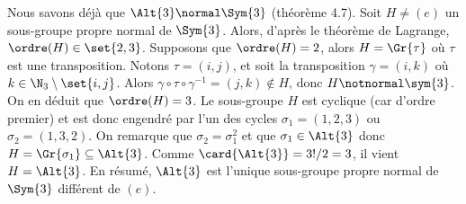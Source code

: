 Nous savons déjà que $\Alt{3}\normal\Sym{3}$ (théorème 4.7).  Soit $H\neq (e)$
un sous-groupe propre normal de $\Sym{3}$. Alors, d'après le théorème de
Lagrange, $\ordre(H)\in\set{2,3}$.  Supposons que $\ordre(H) = 2$, alors
$H = \Gr{\tau}$ où $\tau$ est une transposition.  Notons $\tau = (i,j)$, et
soit la transposition $\gamma = (i,k)$ où $k\in\N_3\setminus\set{i,j}$.  Alors
$\gamma\circ\tau\circ\gamma^{-1} = (j,k) \notin H$, donc $H\notnormal\sym{3}$.
On en déduit que $\ordre(H) = 3$.  Le sous-groupe $H$ est cyclique (car d'ordre
premier) et est donc engendré par l'un des cycles $\sigma_1 = (1,2,3)$ ou
$\sigma_2 = (1,3,2)$. On remarque que $\sigma_2 = \sigma_1^2$ et que
$\sigma_1\in\Alt{3}$ donc $H = \Gr{\sigma_1}\subseteq\Alt{3}$. Comme
$\card{\Alt{3}} = 3!/2 = 3$, il vient $H = \Alt{3}$. En résumé, $\Alt{3}$ est
l'unique sous-groupe propre normal de $\Sym{3}$ différent de $(e)$.
